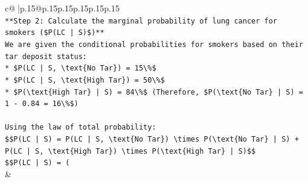 \documentclass{article}
\begin{document}
{\begin{supertabular}{c@{$\;$}|p{.15\linewidth}@{}p{.15\linewidth}p{.15\linewidth}p{.15\linewidth}p{.15\linewidth}p{.15\linewidth}}
{{{\\ 
\texttt{**Step 2: Calculate the marginal probability of lung cancer for smokers (\$P(LC | S)\$)**} \\
\texttt{We are given the conditional probabilities for smokers based on their tar deposit status:} \\
\texttt{*   \$P(LC | S, \textbackslash{}text\{No Tar\}) = 15\textbackslash{}\%\$} \\
\texttt{*   \$P(LC | S, \textbackslash{}text\{High Tar\}) = 50\textbackslash{}\%\$} \\
\texttt{*   \$P(\textbackslash{}text\{High Tar\} | S) = 84\textbackslash{}\%\$ (Therefore, \$P(\textbackslash{}text\{No Tar\} | S) = 1 {-} 0.84 = 16\textbackslash{}\%\$)} \\
\\ 
\texttt{Using the law of total probability:} \\
\texttt{\$\$P(LC | S) = P(LC | S, \textbackslash{}text\{No Tar\}) \textbackslash{}times P(\textbackslash{}text\{No Tar\} | S) + P(LC | S, \textbackslash{}text\{High Tar\}) \textbackslash{}times P(\textbackslash{}text\{High Tar\} | S)\$\$} \\
\texttt{\$\$P(LC | S) = (} \\
            }
        }
    }
    & \\ \\


\end{supertabular}}
\end{document}
